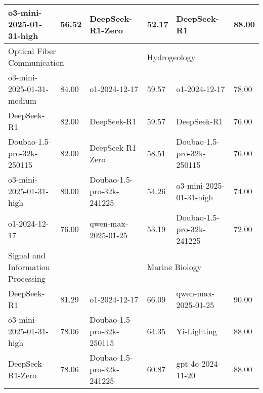 {\begin{longtable}{p{4.2cm}>{\centering\arraybackslash} p{0.8cm}|p{4.2cm} >{\centering\arraybackslash} p{0.8cm}|p{4.2cm} >{\centering\arraybackslash} p{0.8cm}}
\cellcolor{blue!5} o3-mini-2025-01-31-high & \cellcolor{blue!2}56.52 & \cellcolor{yellow!5} DeepSeek-R1-Zero & \cellcolor{yellow!2} 52.17 & \cellcolor{green!5} DeepSeek-R1 & \cellcolor{green!2} 88.00\\
\hline
\multicolumn{2}{p{5.15cm}|}{\cellcolor{blue!10} \centering Optical Fiber Communication} & \multicolumn{2}{p{5.15cm}|}{\cellcolor{yellow!10} \centering Pathogen Biology} & \multicolumn{2}{p{5.15cm}}{\cellcolor{green!10} \centering Hydrogeology}\\
\hline
\cellcolor{blue!5} o3-mini-2025-01-31-medium & \cellcolor{blue!2}84.00 & \cellcolor{yellow!5} o1-2024-12-17 & \cellcolor{yellow!2} 59.57 & \cellcolor{green!5} o1-2024-12-17 & \cellcolor{green!2} 78.00\\
\cellcolor{blue!5} DeepSeek-R1 & \cellcolor{blue!2}82.00 & \cellcolor{yellow!5} DeepSeek-R1 & \cellcolor{yellow!2} 59.57 & \cellcolor{green!5} DeepSeek-R1 & \cellcolor{green!2} 76.00\\
\cellcolor{blue!5} Doubao-1.5-pro-32k-250115 & \cellcolor{blue!2}82.00 & \cellcolor{yellow!5} DeepSeek-R1-Zero & \cellcolor{yellow!2} 58.51 & \cellcolor{green!5} Doubao-1.5-pro-32k-250115 & \cellcolor{green!2} 76.00\\
\cellcolor{blue!5} o3-mini-2025-01-31-high & \cellcolor{blue!2}80.00 & \cellcolor{yellow!5} Doubao-1.5-pro-32k-241225 & \cellcolor{yellow!2} 54.26 & \cellcolor{green!5} o3-mini-2025-01-31-high & \cellcolor{green!2} 74.00\\
\cellcolor{blue!5} o1-2024-12-17 & \cellcolor{blue!2}76.00 & \cellcolor{yellow!5} qwen-max-2025-01-25 & \cellcolor{yellow!2} 53.19 & \cellcolor{green!5} Doubao-1.5-pro-32k-241225 & \cellcolor{green!2} 72.00\\
\hline
\multicolumn{2}{p{5.15cm}|}{\cellcolor{blue!10} \centering Signal and Information Processing} & \multicolumn{2}{p{5.15cm}|}{\cellcolor{yellow!10} \centering Pathology and Pathophysiology} & \multicolumn{2}{p{5.15cm}}{\cellcolor{green!10} \centering Marine Biology}\\
\hline
\cellcolor{blue!5} DeepSeek-R1 & \cellcolor{blue!2}81.29 & \cellcolor{yellow!5} o1-2024-12-17 & \cellcolor{yellow!2} 66.09 & \cellcolor{green!5} qwen-max-2025-01-25 & \cellcolor{green!2} 90.00\\
\cellcolor{blue!5} o3-mini-2025-01-31-high & \cellcolor{blue!2}78.06 & \cellcolor{yellow!5} Doubao-1.5-pro-32k-250115 & \cellcolor{yellow!2} 64.35 & \cellcolor{green!5} Yi-Lighting & \cellcolor{green!2} 88.00\\
\cellcolor{blue!5} DeepSeek-R1-Zero & \cellcolor{blue!2}78.06 & \cellcolor{yellow!5} Doubao-1.5-pro-32k-241225 & \cellcolor{yellow!2} 60.87 & \cellcolor{green!5} gpt-4o-2024-11-20 & \cellcolor{green!2} 88.00\\

\end{longtable}}
